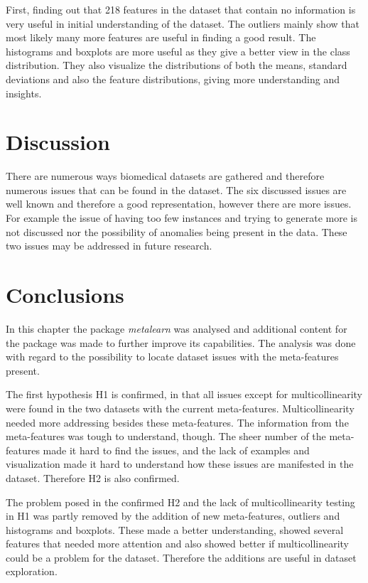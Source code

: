 \documentclass[10pt,a4paper]{report}
\begin{document}
	First, finding out that 218 features in the dataset that contain no information is very useful in initial understanding of the dataset. The outliers mainly show that most likely many more features are useful in finding a good result. The histograms and boxplots are more useful as they give a better view in the class distribution. They also visualize the distributions of both the means, standard deviations and also the feature distributions, giving more understanding and insights.
	
	\section{Discussion}
	\label{DEsec:Discussion}
	
	There are numerous ways biomedical datasets are gathered and therefore numerous issues that can be found in the dataset. The six discussed issues are well known and therefore a good representation, however there are more issues. For example the issue of having too few instances and trying to generate more is not discussed nor the possibility of anomalies being present in the data. These two issues may be addressed in future research.
	
	
	\section{Conclusions}
	\label{DEsec:Conclusions}
	
	In this chapter the package \textit{metalearn} was analysed and additional content for the package was made to further improve its capabilities. The analysis was done with regard to the possibility to locate dataset issues with the meta-features present.
	
	The first hypothesis H1 is confirmed, in that all issues except for multicollinearity were found in the two datasets with the current meta-features. Multicollinearity needed more addressing besides these meta-features. The information from the meta-features was tough to understand, though. The sheer number of the meta-features made it hard to find the issues, and the lack of examples and visualization made it hard to understand how these issues are manifested in the dataset. Therefore H2 is also confirmed.
	
	The problem posed in the confirmed H2 and the lack of multicollinearity testing in H1 was partly removed by the addition of new meta-features, outliers and histograms and boxplots. These made a better understanding, showed several features that needed more attention and also showed better if multicollinearity could be a problem for the dataset. Therefore the additions are useful in dataset exploration.
	
\end{document}
